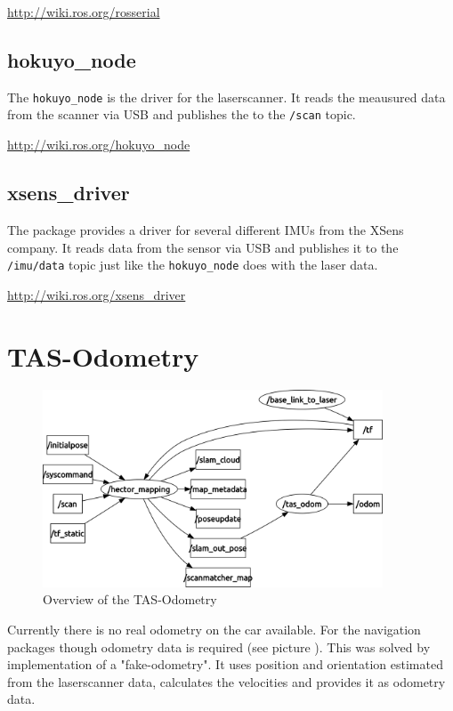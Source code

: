\hyperref[http://wiki.ros.org/rosserial]{http://wiki.ros.org/rosserial}

\subsection{hokuyo\_node}
\label{sec:tas_package_drivers_hokuyo}
The \texttt{hokuyo\_node} is the driver for the laserscanner. It reads the meausured data from the scanner via USB and publishes the to the \texttt{/scan} topic.

\hyperref[http://wiki.ros.org/hokuyo_node]{http://wiki.ros.org/hokuyo\_node}

\subsection{xsens\_driver}
\label{sec:tas_package_drivers_xsens}

The package provides a driver for several different IMUs from the XSens company. It reads data from the sensor via USB and publishes it to the \texttt{/imu/data} topic just like the \texttt{hokuyo\_node} does with the laser data.

\hyperref[http://wiki.ros.org/xsens_driver]{http://wiki.ros.org/xsens\_driver}

\newpage
\section{TAS-Odometry}
\label{sec:tas_package_odom}

\begin{figure}[h]
	\centering
		\includegraphics[width=0.9\textwidth]{diagrams/rqt_odom}
	\caption{Overview of the TAS-Odometry}
	\label{fig:rqt_odom}
\end{figure}

Currently there is no real odometry on the car available. For the navigation packages though odometry data is required (see picture ). This was solved by implementation of a "fake-odometry". It uses position and orientation estimated from the laserscanner data, calculates the velocities and provides it as odometry data.

